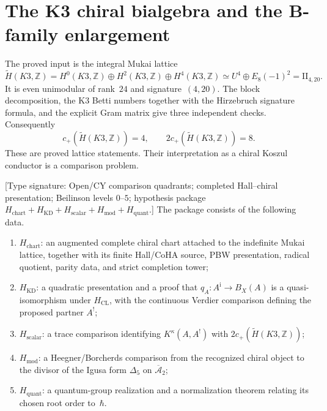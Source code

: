 \section{The K3 chiral bialgebra and the \texorpdfstring{$\mathbf{B}$}{B}-family enlargement}
\label{sec:k3-bkm-enlargement}

The proved input is the integral Mukai lattice
\[
\widetilde H(K3,\mathbb Z)
=H^0(K3,\mathbb Z)\oplus H^2(K3,\mathbb Z)
 \oplus H^4(K3,\mathbb Z)
\simeq U^4\oplus E_8(-1)^2=\mathrm{II}_{4,20}.
\]
It is even unimodular of rank~$24$ and signature~$(4,20)$.  The block
decomposition, the K3 Betti numbers together with the Hirzebruch
signature formula, and the explicit Gram matrix give three independent
checks.  Consequently
\[
c_+(\widetilde H(K3,\mathbb Z))=4,
\qquad
2c_+(\widetilde H(K3,\mathbb Z))=8.
\]
These are proved lattice statements.  Their interpretation as a
chiral Koszul conductor is a comparison problem.

\begin{definition}
\label{def:intro-k3-comparison-package}
\textup{[Type signature: Open/CY comparison quadrants; completed
Hall--chiral presentation; Beilinson levels $0$--$5$; hypothesis
package $H_{\mathrm{chart}}+H_{\mathrm{KD}}+H_{\mathrm{scalar}}
+H_{\mathrm{mod}}+H_{\mathrm{quant}}$.]}
The package consists of the following data.
\begin{enumerate}[label=\textup{(\roman*)}]
\item $H_{\mathrm{chart}}$: an augmented complete chiral chart
attached to the indefinite Mukai lattice, together with its finite
Hall/CoHA source, PBW presentation, radical quotient, parity data, and
strict completion tower;
\item $H_{\mathrm{KD}}$: a quadratic presentation and a proof that
$q_A\colon A^{\mathrm i}\to B_X(A)$ is a quasi-isomorphism under
$H_{\mathrm{CL}}$, with the continuous Verdier comparison defining
the proposed partner $A^!$;
\item $H_{\mathrm{scalar}}$: a trace comparison identifying
$K^\kappa(A,A^!)$ with
$2c_+(\widetilde H(K3,\mathbb Z))$;
\item $H_{\mathrm{mod}}$: a Heegner/Borcherds comparison from the
recognized chiral object to the divisor of the Igusa form
$\Delta_5$ on $\overline{\mathcal A}_2$;
\item $H_{\mathrm{quant}}$: a quantum-group realization and a
normalization theorem relating its chosen root order to~$\hbar$.
\end{enumerate}
\end{definition}


